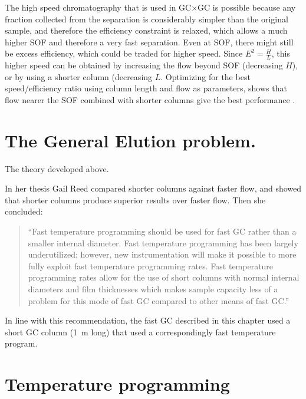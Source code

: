 The high speed chromatography that is used in GC×GC is possible because any
fraction collected from the \oneD separation is considerably simpler than the
original sample, and therefore the efficiency constraint is relaxed, which
allows a much higher SOF and therefore a very fast \twoD separation. Even at
SOF, there might still be excess efficiency, which could be traded for higher
speed. Since \(E^2 = \frac{H}{L} \), this higher speed can be obtained by
increasing the flow beyond SOF (decreasing \(H\)), or by using a shorter column
(decreasing \(L\). Optimizing for the best speed/efficiency ratio using column
length and flow as parameters, shows that flow nearer the SOF combined with
shorter columns give the best performance \autocite{Klee2002, Reed1999}.

\section{The General Elution problem.}

The theory developed above. 

In her thesis Gail Reed \autocite{Reed1999} compared
shorter columns against faster flow, and showed that shorter columns produce
superior results over faster flow.
Then she concluded:

\begin{quotation}

``Fast temperature programming should be used for fast GC rather than a smaller
internal diameter. Fast temperature programming has been largely underutilized;
however, new instrumentation will make it possible to more fully exploit fast
temperature programming rates. Fast temperature programming rates allow for the
use of short columns with normal internal diameters and film thicknesses which
makes sample capacity less of a problem for this mode of fast GC compared to
other means of fast GC.''

\end{quotation}

In line with this recommendation, the fast GC described in this chapter used a
short GC column (\SI{1}{\metre} long) that used a correspondingly fast
temperature program.

\section{Temperature programming}


